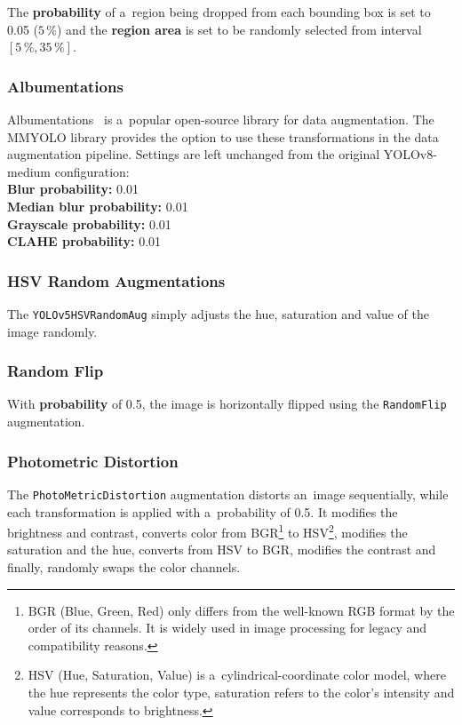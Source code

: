 The \textbf{probability} of a~region being dropped from each bounding box is set
to \num{0.05} ($5\,\%$) and the \textbf{region area} is set to be randomly selected from
interval $[5\,\%, 35\,\%]$.


\subsubsection*{Albumentations}

Albumentations~\cite{Albumentations} is a~popular open-source library for data
augmentation. The MMYOLO library provides the option to use these transformations
in the data augmentation pipeline. Settings are left unchanged from the original
YOLOv8-medium configuration: \\
\textbf{Blur probability:} 0.01 \\
\textbf{Median blur probability:} 0.01 \\
\textbf{Grayscale probability:} 0.01 \\
\textbf{CLAHE probability:} 0.01


\subsubsection*{HSV Random Augmentations}

The \texttt{YOLOv5HSVRandomAug} simply adjusts the hue, saturation and value of
the image randomly.


\subsubsection*{Random Flip}

With \textbf{probability} of 0.5, the image is horizontally flipped using the
\texttt{RandomFlip} augmentation.


\subsubsection*{Photometric Distortion}

The \texttt{PhotoMetricDistortion} augmentation distorts an~image sequentially,
while each transformation is applied with a~probability of 0.5. It modifies the
brightness and contrast, converts color from BGR\footnote{BGR (Blue, Green, Red)
only differs from the well-known RGB format by the order of its channels. It is
widely used in image processing for legacy and compatibility reasons.} to
HSV\footnote{HSV (Hue, Saturation, Value) is a~cylindrical-coordinate color
model, where the hue represents the color type, saturation refers to the color's
intensity and value corresponds to brightness.}, modifies the saturation and the
hue, converts from HSV to BGR, modifies the contrast and finally, randomly swaps
the color channels.


